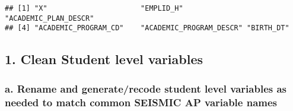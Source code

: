 \documentclass[]{article}
\begin{document}
\begin{verbatim}
## [1] "X"                      "EMPLID_H"               "ACADEMIC_PLAN_DESCR"   
## [4] "ACADEMIC_PROGRAM_CD"    "ACADEMIC_PROGRAM_DESCR" "BIRTH_DT"
\end{verbatim}

\subsection{1. Clean Student level
variables}\label{clean-student-level-variables}

\subsubsection{a. Rename and generate/recode student level variables as
needed to match common SEISMIC AP variable
names}\label{a.-rename-and-generaterecode-student-level-variables-as-needed-to-match-common-seismic-ap-variable-names}
\end{document}
